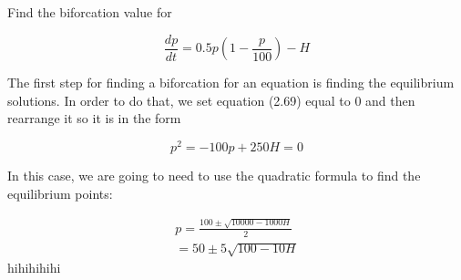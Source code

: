   \begin{problem}
    Find the biforcation value for 

    \begin{equation}
      \frac{dp}{dt}=0.5p\left(1-\frac{p}{100}\right)-H
    \end{equation}

    The first step for finding a biforcation for an equation is finding the equilibrium solutions. In order to do that, we set equation (2.69) equal to 0 and then rearrange it so it is in the form

    \begin{equation}
      p^2=-100p+250H=0
    \end{equation}

    In this case, we are going to need to use the quadratic formula to find the equilibrium points:

    \begin{align}
      p=\frac{100\pm\sqrt{10000-1000H}}{2}\\
      =50\pm5\sqrt{100-10H}
    \end{align}
    hihihihihi
  \end{problem}